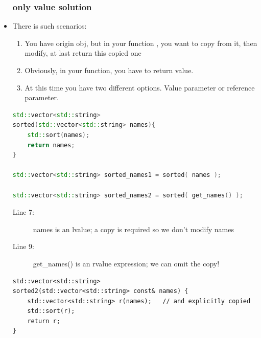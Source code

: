 \documentclass[a4paper,11pt,twoside]{book}
\begin{document}
\begin{itemize}
\subsubsection{only value solution}

\item There is such scenarios:
\begin{enumerate}
	\item You have origin obj, but in your function , you want to copy from it, then modify, at last return this copied one
	\item Obviously, in your function, you have to return value.
	\item At this time you have two different options. Value parameter or reference parameter.
\end{enumerate}

\begin{lstlisting}[frame=single, language=c++]
std::vector<std::string> 
sorted(std::vector<std::string> names){
	std::sort(names);
	return names;
}

std::vector<std::string> sorted_names1 = sorted( names );

std::vector<std::string> sorted_names2 = sorted( get_names() );
\end{lstlisting}
\begin{description}
	\item[Line 7:] names is an lvalue; a copy is required so we don't modify names
	\item[Line 9:] get\_names() is an rvalue expression; we can omit the copy!
\end{description}

\begin{lstlisting}[numbers=none]
std::vector<std::string> 
sorted2(std::vector<std::string> const& names) {
	std::vector<std::string> r(names);   // and explicitly copied
	std::sort(r);
	return r;
}
\end{lstlisting}


\end{itemize}
\end{document}
